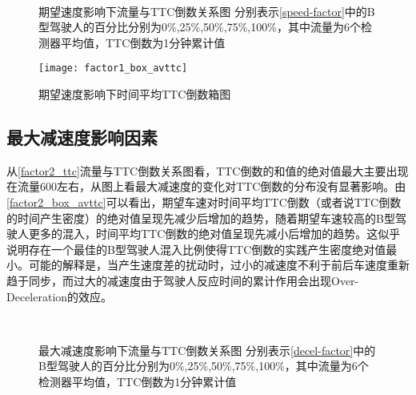 \begin{figure}[H]%
\centering
{}%
\\%
%
\caption[A set of four sub-floats.]{期望速度影响下流量与TTC倒数关系图
分别表示\autoref{speed-factor}中的B型驾驶人的百分比分别为0\%,25\%,50\%,75\%,100\%，其中流量为6个检测器平均值，TTC倒数为1分钟累计值}%
\label{factor1_ttc}%
\end{figure}

\begin{figure}[H]
\begin{center}
\texttt{[image: factor1\_box\_avttc]}
\caption{期望速度影响下时间平均TTC倒数箱图}
\label{factor1_box_avttc}
\end{center}
\end{figure}

\subsection{最大减速度影响因素}

从\autoref{factor2_ttc}流量与TTC倒数关系图看，TTC倒数的和值的绝对值最大主要出现在流量600左右，从图上看最大减速度的变化对TTC倒数的分布没有显著影响。由\autoref{factor2_box_avttc}可以看出，期望车速对时间平均TTC倒数（或者说TTC倒数的时间产生密度）的绝对值呈现先减少后增加的趋势，随着期望车速较高的B型驾驶人更多的混入，时间平均TTC倒数的绝对值呈现先减小后增加的趋势。这似乎说明存在一个最佳的B型驾驶人混入比例使得TTC倒数的实践产生密度绝对值最小。可能的解释是，当产生速度差的扰动时，过小的减速度不利于前后车速度重新趋于同步，而过大的减速度由于驾驶人反应时间的累计作用会出现Over-Deceleration的效应。
\begin{figure}[H]%
\centering
{}%
\\%
%
\caption[A set of four sub-floats.]{最大减速度影响下流量与TTC倒数关系图
分别表示\autoref{decel-factor}中的B型驾驶人的百分比分别为0\%,25\%,50\%,75\%,100\%，其中流量为6个检测器平均值，TTC倒数为1分钟累计值}%
\label{factor2_ttc}%
\end{figure}

